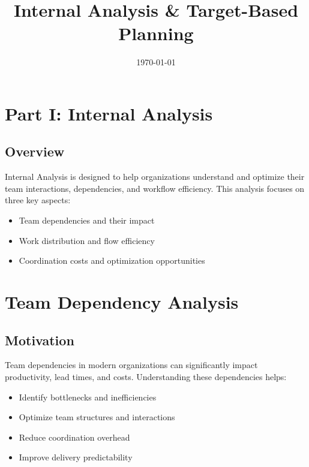 \documentclass[12pt,a4paper]{article}
\title{\textbf{\LARGE Internal Analysis \& Target-Based Planning}}
\author{\Large}
\date{\today}
\newenvironment{explanation}
{\begin{mdframed}[style=explanationstyle,frametitle={Explanation}]}
{\end{mdframed}}
\begin{document}
\maketitle
\thispagestyle{empty}
\tableofcontents
\clearpage

\section{Part I: Internal Analysis}

\subsection{Overview}

\begin{explanation}
Internal Analysis is designed to help organizations understand and optimize their team interactions, dependencies, and workflow efficiency. This analysis focuses on three key aspects:
\begin{itemize}
    \item Team dependencies and their impact
    \item Work distribution and flow efficiency
    \item Coordination costs and optimization opportunities
\end{itemize}
\end{explanation}

\section{Team Dependency Analysis}

\subsection{Motivation}

\begin{explanation}
Team dependencies in modern organizations can significantly impact productivity, lead times, and costs. Understanding these dependencies helps:
\begin{itemize}
    \item Identify bottlenecks and inefficiencies
    \item Optimize team structures and interactions
    \item Reduce coordination overhead
    \item Improve delivery predictability
\end{itemize}
\end{explanation}
\end{document}
